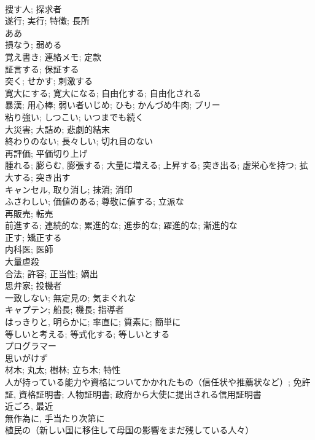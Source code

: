 \documentclass[8pt]{extreport}
\begin{document}
\begin{CJK}{UTF8}{min}
\\	捜す人; 探求者	
\\	遂行; 実行; 特徴; 長所	
\\	ああ	
\\	損なう; 弱める	
\\	覚え書き; 連絡メモ; 定款	
\\	証言する; 保証する	
\\	突く; せかす; 刺激する	
\\	寛大にする; 寛大になる; 自由化する; 自由化される	
\\	暴漢; 用心棒; 弱い者いじめ; ひも; かんづめ牛肉; ブリー	
\\	粘り強い; しつこい; いつまでも続く	
\\	大災害; 大詰め; 悲劇的結末	
\\	終わりのない; 長々しい; 切れ目のない	
\\	再評価; 平価切り上げ	
\\	腫れる; 膨らむ, 膨張する; 大量に増える; 上昇する; 突き出る; 虚栄心を持つ; 拡大する; 突き出す	
\\	キャンセル, 取り消し; 抹消; 消印	
\\	ふさわしい; 価値のある; 尊敬に値する; 立派な	
\\	再販売; 転売	
\\	前進する; 連続的な; 累進的な; 進歩的な; 躍進的な; 漸進的な	
\\	正す; 矯正する	
\\	内科医; 医師	
\\	大量虐殺	
\\	合法; 許容; 正当性; 嫡出	
\\	思弁家; 投機者	
\\	一致しない; 無定見の; 気まぐれな	
\\	キャプテン; 船長; 機長; 指導者	
\\	はっきりと, 明らかに; 率直に; 質素に; 簡単に	
\\	等しいと考える; 等式化する; 等しいとする	
\\	プログラマー	
\\	思いがけず	
\\	材木; 丸太; 樹林; 立ち木; 特性	
\\	人が持っている能力や資格についてかかれたもの（信任状や推薦状など）; 免許証, 資格証明書; 人物証明書; 政府から大使に提出される信用証明書	
\\	近ごろ, 最近	
\\	無作為に, 手当たり次第に	
\\	植民の（新しい国に移住して母国の影響をまだ残している人々）	

\end{CJK}
\end{document}
